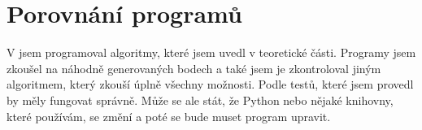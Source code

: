 \chapter{Porovnání programů}
\label{chap:diskuze}

V  jsem programoval algoritmy, které jsem uvedl v teoretické části. Programy jsem zkoušel na náhodně generovaných bodech a také jsem je zkontroloval jiným algoritmem, který zkouší úplně všechny možnosti. Podle testů, které jsem provedl by měly fungovat správně. Může se ale stát, že Python nebo nějaké knihovny, které používám, se změní a poté se bude muset program upravit. 

